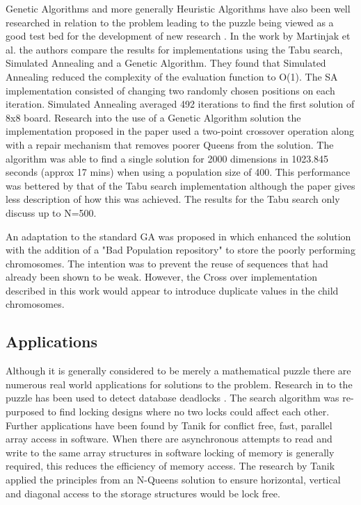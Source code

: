 \documentclass[conference]{IEEEtran}
\begin{document}
Genetic Algorithms and more generally Heuristic Algorithms have also been well researched in relation to the problem leading to the puzzle being viewed as a good test bed for the development of new research \cite{Polynomial}. In the work by Martinjak et al. \cite{comparison} the authors compare the results for implementations using the Tabu search, Simulated Annealing and a Genetic Algorithm. They found that Simulated Annealing reduced the complexity of the evaluation function to O(1). The SA implementation consisted of changing two randomly chosen positions on each iteration. Simulated Annealing averaged 492 iterations to find the first solution of 8x8 board. Research into the use of a Genetic Algorithm solution the implementation proposed in the paper used a two-point crossover operation along with a repair mechanism that removes poorer Queens from the solution. The algorithm was able to find a single solution for 2000 dimensions in 1023.845 seconds (approx 17 mins) when using a population size of 400. This performance was bettered by that of the Tabu search implementation although the paper gives less description of how this was achieved. The results for the Tabu search only discuss up to N=500.

An adaptation to the standard GA was proposed in \cite{Adaptive} which enhanced the solution with the addition of a "Bad Population repository" to store the poorly performing chromosomes. The intention was to prevent the reuse of sequences that had already been shown to be weak. However, the Cross over implementation described in this work would appear to introduce duplicate values in the child chromosomes.

\subsection{Applications}

Although it is generally considered to be merely a mathematical puzzle there are numerous real world applications for solutions to the problem. Research in to the puzzle has been used to detect database deadlocks \cite{Deadlock}. The search algorithm was re-purposed to find locking designs where no two locks could affect each other. Further applications have been found by Tanik \cite{SIMD} \cite{Circulant} for conflict free, fast, parallel array access in software. When there are asynchronous attempts to read and write to the same array structures in software locking of memory is generally required, this reduces the efficiency of memory access. The research by Tanik applied the principles from an N-Queens solution to ensure horizontal, vertical and diagonal access to the storage structures would be lock free.
\end{document}
